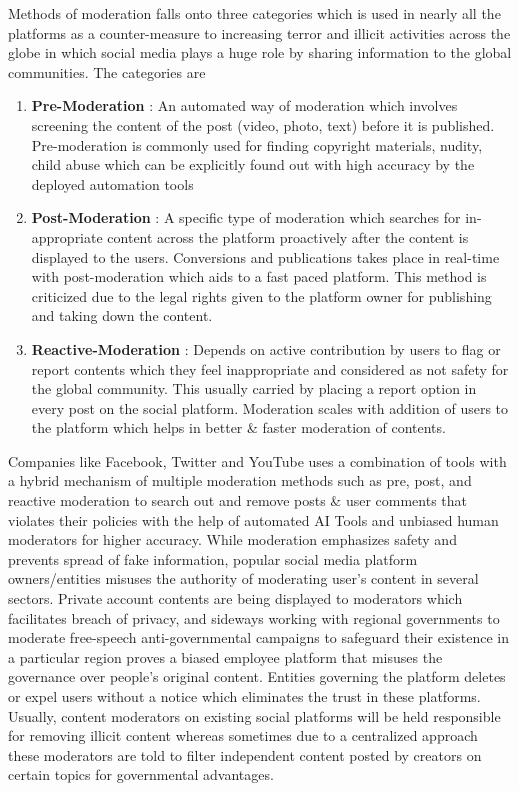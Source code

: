 \documentclass[letterpaper,11pt]{article}
\begin{document}
Methods of moderation falls onto three categories which is used in nearly all the platforms as a counter-measure to increasing terror and illicit activities across the globe in which social media plays a huge role by sharing information to the global communities. The categories are
\begin{enumerate}[wide, labelwidth=!, labelindent=0pt]
\item \textbf{Pre-Moderation} : An automated way of moderation which involves screening the content of the post (video, photo, text) before it is published. Pre-moderation is commonly used for finding copyright materials, nudity, child abuse which can be explicitly found out with high accuracy by the deployed automation tools
\item \textbf{Post-Moderation} : A specific type of moderation which searches for in-appropriate content across the platform proactively after the content is displayed to the users. Conversions and publications takes place in real-time with post-moderation which aids to a fast paced platform. This method is criticized due to the legal rights given to the platform owner for publishing and taking down the content.
\item \textbf{Reactive-Moderation} : Depends on active contribution by users to flag or report contents which they feel inappropriate and considered as not safety for the global community. This usually carried by placing a report option in every post on the social platform. Moderation scales with addition of users to the platform which helps in better \& faster moderation of contents.
\end{enumerate}

Companies like Facebook, Twitter and YouTube uses a combination of tools with a hybrid mechanism of multiple moderation methods such as pre, post, and reactive moderation to search out and remove posts \& user comments that violates their policies with the help of automated AI Tools and unbiased human moderators for higher accuracy. While moderation emphasizes safety and prevents spread of fake information, popular social media platform owners/entities misuses the authority of moderating user's content in several sectors. Private account contents are being displayed to moderators which facilitates breach of privacy, and sideways working with regional governments to moderate free-speech anti-governmental campaigns to safeguard their existence in a particular region proves a biased employee platform that misuses the governance over people's original content. Entities governing the platform deletes or expel users without a notice which eliminates the trust in these platforms. Usually, content moderators on existing social platforms will be held responsible for removing illicit content whereas sometimes due to a centralized approach these moderators are told to filter independent content posted by creators on certain topics for governmental advantages.\\
\end{document}
